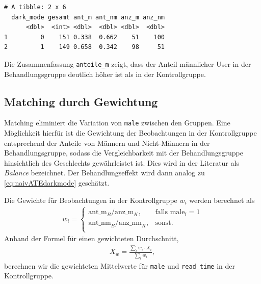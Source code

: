 \documentclass[
  a4paper,
  DIV=11,
  oneside]{scrreprt}
\begin{document}
\begin{verbatim}
# A tibble: 2 x 6
  dark_mode gesamt ant_m ant_nm anz_m anz_nm
      <dbl>  <int> <dbl>  <dbl> <dbl>  <dbl>
1         0    151 0.338  0.662    51    100
2         1    149 0.658  0.342    98     51
\end{verbatim}

Die Zusammenfassung \texttt{anteile\_m} zeigt, dass der Anteil
männlicher User in der Behandlungsgruppe deutlich höher ist als in der
Kontrollgruppe.

\hypertarget{matching-durch-gewichtung}{%
\subsection{Matching durch Gewichtung}\label{matching-durch-gewichtung}}

Matching eliminiert die Variation von \texttt{male} zwischen den
Gruppen. Eine Möglichkeit hierfür ist die Gewichtung der Beobachtungen
in der Kontrollgruppe entsprechend der Anteile von Männern und
Nicht-Männern in der Behandlungsgruppe, sodass die Vergleichbarkeit mit
der Behandlungsgruppe hinsichtlich des Geschlechts gewährleistet ist.
Dies wird in der Literatur als \emph{Balance} bezeichnet. Der
Behandlungseffekt wird dann analog zu \eqref{eq:naivATEdarkmode}
geschätzt.

Die Gewichte für Beobachtungen in der Kontrollgruppe \(w_i\) werden
berechnet als \begin{align}
  w_i = 
  \begin{cases}
    \text{ant\_m}_B/\text{anz\_m}_{K}, & \text{falls } \text{male}_i = 1\\
        \text{ant\_nm}_B/\text{anz\_nm}_{K}, & \text{sonst.}\\
  \end{cases}\label{eq:darkmodeweights}
\end{align} Anhand der Formel für einen gewichteten Durchschnitt,
\begin{align}
  \overline{X}_w = \frac{\sum_i w_i \cdot X_i}{\sum_i w_i},
\end{align} berechnen wir die gewichteten Mittelwerte für \texttt{male}
und \texttt{read\_time} in der Kontrollgruppe.
\end{document}
